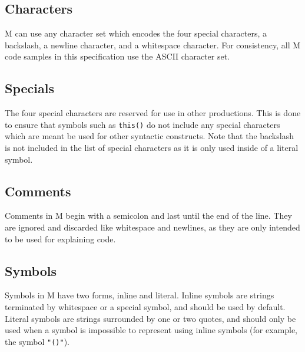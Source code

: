 \documentclass{article}
\newcommand{\comm}[1]{}
\begin{document}
    \begin{multicols}{\comm{2}}
        \subsection{Characters}\label{subsec:characters}

        \begin{minipage}{\columnwidth}
            M can use any character set which encodes the four special characters, a backslash, a newline character, and a whitespace character.
            For consistency, all M code samples in this specification use the ASCII character set.
        \end{minipage}

        \subsection{Specials}\label{subsec:specials}

        \begin{minipage}{\columnwidth}
            The four special characters are reserved for use in other productions.
            This is done to ensure that symbols such as \lstinline{this()} do not include any special characters which are meant be used for other syntactic constructs.
            Note that the backslash is not included in the list of special characters as it is only used inside of a literal symbol.
        \end{minipage}

        \subsection{Comments}\label{subsec:comments}

        \begin{minipage}{\columnwidth}
            Comments in M begin with a semicolon and last until the end of the line.
            They are ignored and discarded like whitespace and newlines, as they are only intended to be used for explaining code.
        \end{minipage}

        \subsection{Symbols}\label{subsec:symbols}

        \begin{minipage}{\columnwidth}
            Symbols in M have two forms, inline and literal.
            Inline symbols are strings terminated by whitespace or a special symbol, and should be used by default.
            Literal symbols are strings surrounded by one or two quotes, and should only be used when a symbol is impossible to represent using inline symbols (for example, the symbol \lstinline{"()"}).
        \end{minipage}


\end{multicols}
\end{document}
